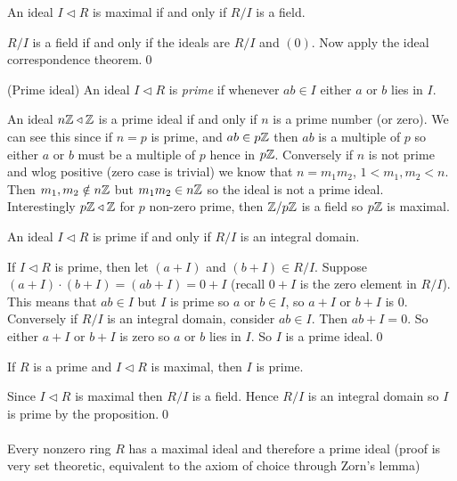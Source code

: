 \documentclass{article}
\newcommand{\nrm}{\triangleleft}
\begin{document}
\begin{itemize}
\begin{proposition}
  An ideal $ I\nrm R $ is maximal if and only if $ R/I $ is a field.
\end{proposition}
\pf $ R/I $ is a field if and only if the ideals are $ R/I $ and $ (0) $. Now apply the ideal correspondence theorem.\qed
\begin{definition}
	(Prime ideal) An ideal $ I\nrm R $ is \textit{prime} if whenever $ ab\in I $ either $ a $ or $ b $ lies in $ I $.
\end{definition}
An ideal $ n\Z\nrm \Z $ is a prime ideal if and only if $ n $ is a prime number (or zero). We can see this since if $ n=p $ is prime, and $ ab\in p\mathbb{Z} $ then $ ab $ is a multiple of $ p $ so either $ a $ or $ b $ must be a multiple of $ p $ hence in $ p\mathbb{Z} $. Conversely if $ n $ is not prime and wlog positive (zero case is trivial) we know that $ n=m_1m_2 $, $ 1<m_1,m_2<n $. Then $ m_1,m_2\notin n\mathbb{Z} $ but $ m_1m_2\in n\mathbb{Z} $ so the ideal is not a prime ideal.
\\ Interestingly $ p\Z\nrm \Z $ for $ p $ non-zero prime, then $ \mathbb{Z}/p\mathbb{Z} $ is a field so $ p\mathbb{Z} $ is maximal.

\begin{proposition}
  An ideal $ I\nrm R$ is prime if and only if $ R/I $ is an integral domain.
\end{proposition}
\pf If $ I \nrm R $ is prime, then let $ (a+I) $ and $ (b+I)\in R/I $. Suppose $ (a+I)\cdot(b+I)=(ab+I)=0+I $ (recall $ 0+I $ is the zero element in $ R/I $). This means that $ ab\in I $ but $ I $ is prime so $ a $ or $ b\in I $, so $ a+I $ or $ b+I $ is $ 0 $.\\
Conversely if $ R/I $ is an integral domain, consider $ ab\in I $. Then $ ab + I = 0 $. So either $ a+I $ or $ b+I $ is zero so $ a $ or $ b $ lies in $ I $. So $ I $ is a prime ideal.\qed

\begin{corollary}
  If $ R $ is a prime and $ I\nrm R $ is maximal, then $ I $ is prime.
\end{corollary}
\pf Since $ I\nrm R $ is maximal then $ R/I $ is a field. Hence $ R/I $ is an integral domain so $ I $ is prime by the proposition.\qed\\\\
Every nonzero ring $ R $ has a maximal ideal and therefore a prime ideal (proof is very set theoretic, equivalent to the axiom of choice through Zorn's lemma)


\end{itemize}
\end{document}
